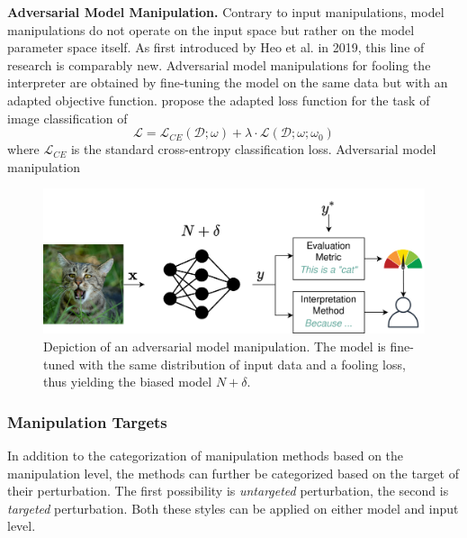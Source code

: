 \documentclass[sigconf]{acmart}
\begin{document}
\par\smallskip
\noindent\textbf{Adversarial Model Manipulation.} 
Contrary to input manipulations, model manipulations do not operate on the input space but rather on the model parameter space itself. 
As first introduced by Heo et al. \cite{fooling_nn_interpreters} in 2019, this line of research is comparably new. 
Adversarial model manipulations for fooling the interpreter are obtained by fine-tuning the model on the same data but with an adapted objective function. \cite{fooling_nn_interpreters} propose the adapted loss function for the task of image classification of $$ \mathcal{L} = \mathcal{L}_{CE}(\mathcal{D};\omega) + \lambda \cdot \mathcal{L}(\mathcal{D};\omega; \omega_0) $$ where $\mathcal{L}_{CE}$ is the standard cross-entropy classification loss. 
Adversarial model manipulation
\begin{figure}[ht]
    \centering
    \includegraphics[width=\linewidth]{figures/model_manipulations.png}
    \caption{Depiction of an adversarial model manipulation. The model is fine-tuned with the same distribution of input data and a fooling loss, thus yielding the biased model $N+\delta$.}
    \label{fig:input_manipulation}
    \vspace{-0.3cm}
\end{figure}

\subsubsection{Manipulation Targets}
\label{subsubsec:manipulation_targets}

\par\smallskip
\noindent
In addition to the categorization of manipulation methods based on the manipulation level, the methods can further be categorized based on the target of their perturbation. The first possibility is \textit{untargeted} perturbation, the second is \textit{targeted} perturbation. Both these styles can be applied on either model and input level. 
\end{document}

